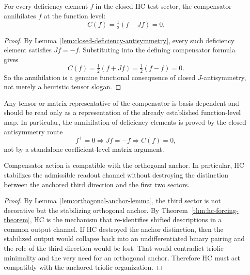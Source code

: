 \begin{proposition}
\label{prop:functional-hc-annihilation}
For every deficiency element $f$ in the closed HC test sector, the compensator
annihilates $f$ at the function level:
\[
  C(f)=\tfrac12(f+Jf)=0.
\]
\end{proposition}

\begin{proof}
By Lemma~\ref{lem:closed-deficiency-antisymmetry}, every such deficiency element
satisfies $Jf=-f$. Substituting into the defining compensator formula gives
\[
  C(f)=\tfrac12(f+Jf)=\tfrac12(f-f)=0.
\]
So the annihilation is a genuine functional consequence of closed
$J$-antisymmetry, not merely a heuristic tensor slogan.
\end{proof}

\begin{remark}
\label{rem:tensor-secondary-functional-proof}
Any tensor or matrix representative of the compensator is basis-dependent and
should be read only as a representation of the already established function-level
map. In particular, the annihilation of deficiency elements is proved by the
closed antisymmetry route
\[
  f^+=0 \Longrightarrow Jf=-f \Longrightarrow C(f)=0,
\]
not by a standalone coefficient-level matrix argument.
\end{remark}

\begin{lemma}
\label{lem:anchor-compatibility-lemma}
Compensator action is compatible with the orthogonal anchor. In particular, HC
stabilizes the admissible readout channel without destroying the distinction
between the anchored third direction and the first two sectors.
\end{lemma}

\begin{proof}
By Lemma~\ref{lem:orthogonal-anchor-lemma}, the third sector is not decorative
but the stabilizing orthogonal anchor. By Theorem~\ref{thm:hc-forcing-theorem},
HC is the mechanism that re-identifies shifted descriptions in a common output
channel. If HC destroyed the anchor distinction, then the stabilized output
would collapse back into an undifferentiated binary pairing and the role of the
third direction would be lost. That would contradict triolic minimality and the
very need for an orthogonal anchor. Therefore HC must act compatibly with the
anchored triolic organization.
\end{proof}

